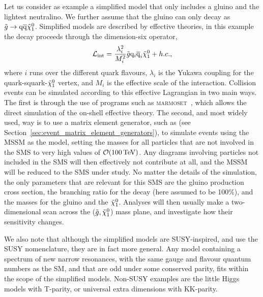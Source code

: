 Let us consider as example a simplified model that only includes a gluino and the lightest
neutralino. We further assume that the gluino can only decay as $\tilde{g}\rightarrow \mathrm{q} \overline{\mathrm{q}}
\tilde{\chi}_1^0$. Simplified models are described by effective theories, in this example the decay
proceeds through the dimension-six operator, 
\begin{equation}
  \mathcal{L}_{\text{int}} = \frac{\lambda_i^2}{M_i^2} \tilde{g} \mathrm{q}_i \overline{\mathrm{q}}_i \tilde{\chi}_1^0 + h.c. , 
\end{equation}
where $i$ runs over the different quark flavours, $\lambda_i$ is the Yukawa coupling for the
quark-squark-$\tilde{\chi}_1^0$ vertex, and $M_i$ is the effective scale of the interaction. 
Collision events can be simulated according to this effective Lagrangian in two main ways. The
first is through the use of programs such as \textsc{marmoset}~\cite{ArkaniHamed:2007fw}, which
allows the direct simulation of the on-shell effective theory. 
The second, and most widely used, way is to use a matrix element generator, such as \MADGRAPH (see
Section~\ref{sec:event_matrix_element_generators}), to simulate events using the MSSM as the model,
setting the masses for all particles that are not involved in the SMS to very high values of
$\mathcal{O}(100\,\text{Te\hspace{-.08em}V})$.
Any diagrams involving particles not included in the SMS will then effectively not contribute at
all, and the MSSM will be reduced to the SMS under study.  
No matter the details of the simulation, the only parameters that are relevant for this SMS are the
gluino production cross
section, the branching ratio for the decay (here assumed to be 100\%), and the masses for the gluino
and the $\tilde{\chi}_1^0$. Analyses will then usually make a two-dimensional scan across the
($\tilde{g},\tilde{\chi}_1^0$) mass plane, and investigate how their sensitivity changes.


We also note that although the simplified models are SUSY-inspired, and use the SUSY nomenclature,
they are in fact more general. Any model containing a spectrum of new narrow resonances, with the
same gauge and flavour quantum numbers as the SM, and that are odd under some conserved parity, fits
within the scope of the simplified models. Non-SUSY examples are the little Higgs models with
T-parity, or universal extra dimensions with KK-parity. 



 
